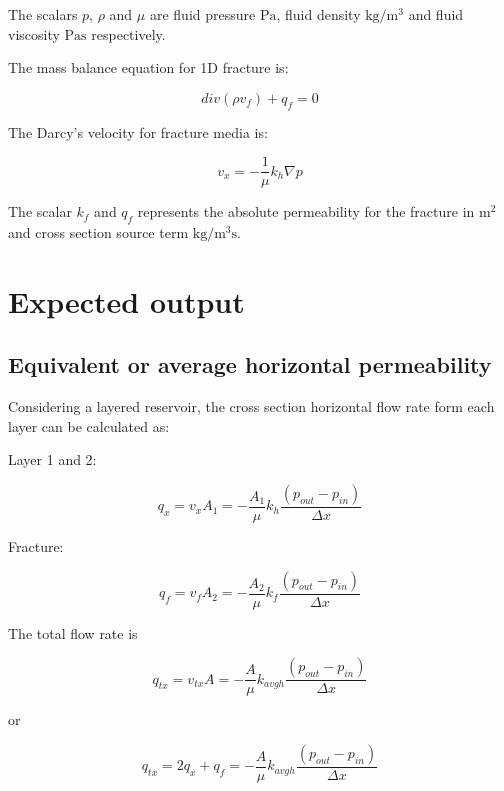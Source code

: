 \documentclass{article}
\begin{document}
The scalars $p$, $\rho$ and $\mu$ are fluid pressure $\si{\pascal}$, fluid density $\si{\kilo\gram\per\cubic\metre}$ and fluid viscosity $\si{\pascal\second}$ respectively.

The mass balance equation for 1D fracture is:

\begin{equation}
div\left(\rho v_{f}\right)+q_{f}=0
\end{equation}

The Darcy's velocity for fracture media is:

\begin{equation}
v_{x}=-\frac{1}{\mu}k_{h}\nabla p
\end{equation}

The scalar $k_{f}$ and $q_{f}$ represents the absolute permeability for the fracture in $\si{\square\metre}$ and cross section source term $\si{\kilo\gram\per\cubic\metre\second}$.

\section{Expected output}

\subsection*{Equivalent or average horizontal permeability}


Considering a layered reservoir, the cross section horizontal flow
rate form each layer can be calculated as:

Layer 1 and 2:

\begin{equation}
q_{x}=v_{x}A_{1}=-\frac{A_{1}}{\mu}k_{h}\frac{\left(p_{out}-p_{in}\right)}{\Delta x}
\end{equation}

Fracture:

\begin{equation}
q_{f}=v_{f}A_{2}=-\frac{A_{2}}{\mu}k_{f}\frac{\left(p_{out}-p_{in}\right)}{\Delta x}
\end{equation}

The total flow rate is 

\begin{equation}
q_{tx}=v_{tx}A=-\frac{A}{\mu}k_{avgh}\frac{\left(p_{out}-p_{in}\right)}{\Delta x}
\end{equation}

or

\begin{equation}
q_{tx}=2 q_{x}+q_{f}=-\frac{A}{\mu}k_{avgh}\frac{\left(p_{out}-p_{in}\right)}{\Delta x}
\end{equation}
\end{document}
